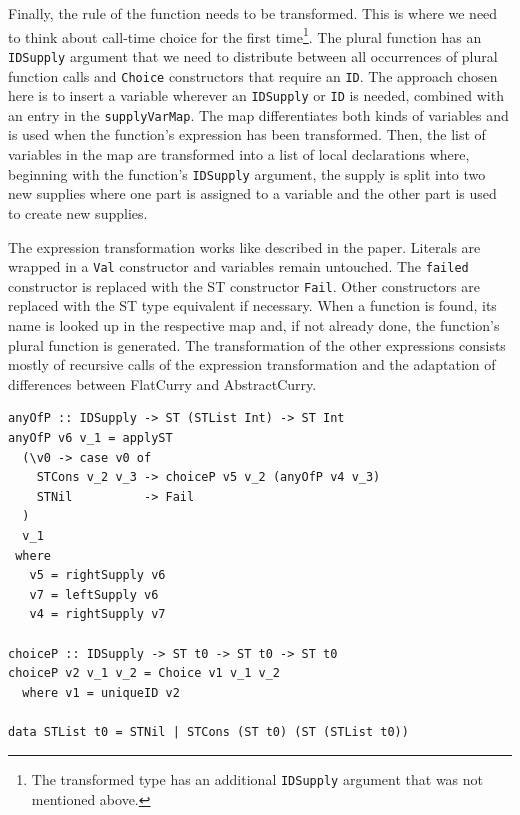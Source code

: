 \documentclass[a4paper, 11pt, fleqn]{scrreprt}
\newcommand{\cinline}[1]{\texttt{#1}}
\begin{document}
Finally, the rule of the function needs to be transformed. This is where we need to think about call-time choice for the first time\footnote{The transformed type has an additional \cinline{IDSupply} argument that was not mentioned above.}. The plural function has an \cinline{IDSupply} argument that we need to distribute between all occurrences of plural function calls and \cinline{Choice} constructors that require an \cinline{ID}. The approach chosen here is to insert a variable wherever an \cinline{IDSupply} or \cinline{ID} is needed, combined with an entry in the \cinline{supplyVarMap}. The map differentiates both kinds of variables and is used when the function's expression has been transformed. Then, the list of variables in the map are transformed into a list of local declarations where, beginning with the function's \cinline{IDSupply} argument, the supply is split into two new supplies where one part is assigned to a variable and the other part is used to create new supplies.

The expression transformation works like described in the paper. Literals are wrapped in a \cinline{Val} constructor and variables remain untouched. The \cinline{failed} constructor is replaced with the ST constructor \cinline{Fail}. Other constructors are replaced with the ST type equivalent if necessary. When a function is found, its name is looked up in the respective map and, if not already done, the function's plural function is generated. The transformation of the other expressions consists mostly of recursive calls of the expression transformation and the adaptation of differences between FlatCurry and AbstractCurry.

\begin{verbatim}
anyOfP :: IDSupply -> ST (STList Int) -> ST Int
anyOfP v6 v_1 = applyST
  (\v0 -> case v0 of
    STCons v_2 v_3 -> choiceP v5 v_2 (anyOfP v4 v_3)
    STNil          -> Fail
  )
  v_1
 where
   v5 = rightSupply v6
   v7 = leftSupply v6
   v4 = rightSupply v7

choiceP :: IDSupply -> ST t0 -> ST t0 -> ST t0
choiceP v2 v_1 v_2 = Choice v1 v_1 v_2
  where v1 = uniqueID v2

data STList t0 = STNil | STCons (ST t0) (ST (STList t0))
\end{verbatim}
\end{document}
